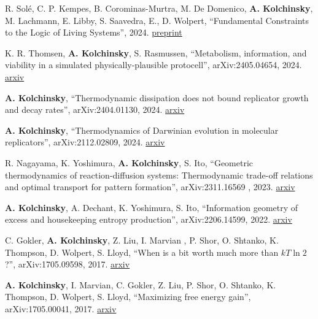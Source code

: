 
R. Solé, C. P. Kempes, B. Corominas-Murtra, M. De Domenico, \textbf{A. Kolchinsky}, M. Lachmann, E. Libby, S. Saavedra, E., D. Wolpert, ``Fundamental Constraints to the Logic of Living Systems'', 2024. \href{https://www.preprints.org/manuscript/202406.0891/v1}{preprint}

K. R. Thomsen, \textbf{A. Kolchinsky}, S. Rasmussen, ``Metabolism, information, and viability in a simulated physically-plausible protocell'', arXiv:2405.04654, 2024. \href{http://arxiv.org/abs/2405.04654}{arxiv}

\textbf{A. Kolchinsky}, ``Thermodynamic dissipation does not bound replicator growth and decay rates'', arXiv:2404.01130, 2024. \href{http://arxiv.org/abs/2404.01130}{arxiv} 

\textbf{A. Kolchinsky}, ``Thermodynamics of Darwinian evolution in molecular replicators'', arXiv:2112.02809, 2024. \href{http://arxiv.org/abs/2112.02809}{arxiv} 

R. Nagayama, K. Yoshimura, \textbf{A. Kolchinsky}, S. Ito, ``Geometric thermodynamics of reaction-diffusion systems: Thermodynamic trade-off relations and optimal transport for pattern formation'', arXiv:2311.16569 , 2023. \href{https://arxiv.org/abs/2311.16569}{arxiv}
 
\textbf{A. Kolchinsky}, A. Dechant, K. Yoshimura, S. Ito, 
``Information geometry of excess and housekeeping entropy production'', arXiv:2206.14599, 2022. \href{https://arxiv.org/abs/2206.14599}{arxiv}

C. Gokler, \textbf{A. Kolchinsky}, Z. Liu, I. Marvian , P. Shor, O. Shtanko, K. Thompson, D. Wolpert, S. Lloyd, ``When is a bit worth much more than $kT \ln 2$?'', arXiv:1705.09598, 2017. \href{https://arxiv.org/abs/1705.09598}{arxiv}

\textbf{A. Kolchinsky}, I. Marvian, C. Gokler, Z. Liu, P. Shor, O. Shtanko, K. Thompson, D. Wolpert, S. Lloyd, ``Maximizing free energy gain'', arXiv:1705.00041, 2017. \href{https://arxiv.org/abs/1705.00041}{arxiv}

